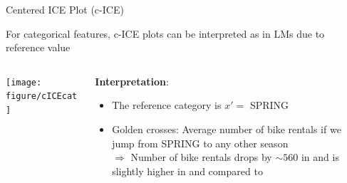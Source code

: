 \documentclass[11pt,compress,t,notes=noshow, aspectratio=169, xcolor=table]{beamer}
\begin{document}
\begin{frame}{Centered ICE Plot (c-ICE)}

For categorical features, c-ICE plots can be interpreted as in LMs due to reference value

\begin{columns}[c, totalwidth=\textwidth]
\begin{column}{0.44\textwidth}

\begin{center}
\texttt{[image: figure/cICEcat]}
\end{center}

\end{column}
\begin{column}{0.55\textwidth}

\textbf{Interpretation}: \\
\begin{itemize}
\item The reference category is $x' =$ SPRING
\item Golden crosses: Average number of bike rentals if we jump from SPRING to any other season\\
$\Rightarrow$ Number of bike rentals drops by $\sim 560$ in  and is slightly higher in  and  compared to 
\end{itemize}

\end{column}
\end{columns}

\end{frame}


\endlecture
\end{document}
